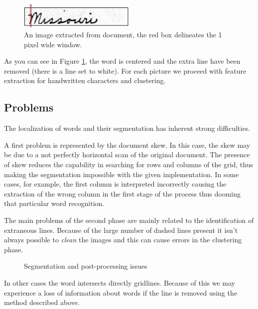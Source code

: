 \begin{figure}[!ht]
\centering
\vspace{0.3cm}
\includegraphics[width=0.5\textwidth]{images/missouri_1pix.jpg}
\caption{An image extracted from document, the red box delineates the 1 pixel wide window.}
\label{fig:extracted_image}
\end{figure}

As you can see in Figure \ref{fig:extracted_image}, the word is centered and the extra line have been removed (there is a line set to white). For each picture we proceed with feature extraction for handwritten characters and clustering. 

\subsection{Problems}

The localization of words and their segmentation has inherent strong difficulties.

A first problem is represented by the document skew. In this case, the skew may be due to a not perfectly horizontal scan of the original document. The presence of skew reduces the capability in searching for rows and columns of the grid, thus making the segmentation impossible with the given implementation. In some cases, for example, the first column is interpreted incorrectly causing the extraction of the wrong column in the first stage of the process thus dooming that particular word recognition.

The main problems of the second phase are mainly related to the identification of extraneous lines. Because of the large number of dashed lines present it isn't always possible to \emph{clean} the images and this can cause errors in the clustering phase.

\begin{figure}[!ht]
 \centering
 \hspace{5mm}
 \caption{Segmentation and post-processing issues}
 \end{figure}

In other cases the word intersects directly gridlines. Because of this we may experience a loss of information about words if the line is removed using the method described above.

